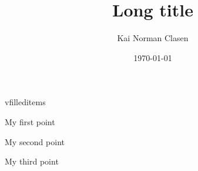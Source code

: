 \documentclass[aspectratio=169]{beamer}
\title[\LaTeX{} vfilleditems]{Long title}
\author{Kai Norman Clasen}
\institute{}
\date{\today}
\begin{document}
\begin{frame}{vfilleditems}
  \begin{vfilleditems}
    \item My first point
    \item My second point
    \item My third point
  \end{vfilleditems}
\end{frame}
\end{document}
